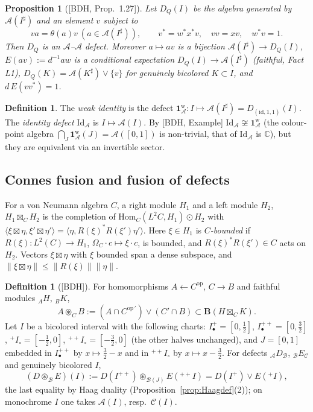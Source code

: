 \documentclass[11pt]{article}
\newtheorem{proposition}[theorem]{Proposition}
\theoremstyle{definition}
\newtheorem{definition}[theorem]{Definition}
\theoremstyle{remark}
\newcommand{\cA}{\mathcal A}
\newcommand{\cB}{\mathcal B}
\newcommand{\cC}{\mathcal C}
\newcommand{\Om}{\Omega}
\newcommand{\bfB}{\mathbf B}
\newcommand{\fus}{\boxtimes}
\newcommand{\cfus}{\circledast}
\newcommand{\ip}[2]{\langle #1,#2\rangle}
\newcommand{\Id}{\mathrm{Id}}
\newcommand{\Wk}{\mathbf 1^{\mathrm w}_{\cA}}
\begin{document}
\begin{proposition}[{[BDH, Prop.~1.27]}]\label{prop:DQ}
Let $D_Q(I)$ be the algebra generated by $\cA(I^\sharp)$ and an element $v$ subject to
\[
va=\theta(a)v\ (a\in\cA(I^\sharp)),\qquad v^*=w^*x^*v,\quad vv=xv,\quad w^*v=1 .
\]
Then $D_Q$ is an $\cA$--$\cA$ defect. Moreover $a\mapsto av$ is a bijection $\cA(I^\sharp)\to D_Q(I)$, $E(av):=d^{-1}aw$ is a conditional expectation $D_Q(I)\to\cA(I^\sharp)$ (faithful, Fact L1), $D_Q(K)=\cA(K^\sharp)\vee\{v\}$ for genuinely bicolored $K\subset I$, and $d\,E(vv^*)=1$.
\end{proposition}

\begin{definition}\label{def:Idnat}
The \emph{weak identity} is the defect $\Wk\colon I\mapsto\cA(I^\sharp)=D_{(\mathrm{id},1,1)}(I)$. The \emph{identity defect} $\Id_\cA$ is $I\mapsto\cA(I)$. By [BDH, Example] $\Id_\cA\not\cong\Wk$ (the colour-point algebra $\bigcap_J\Wk(J)=\cA([0,1])$ is non-trivial, that of $\Id_\cA$ is $\mathbb C$), but they are equivalent via an invertible sector.
\end{definition}

\subsection{Connes fusion and fusion of defects}\label{sec:fusion}
For a von Neumann algebra $C$, a right module $H_1$ and a left module $H_2$, $H_1\fus_CH_2$ is the completion of $\mathrm{Hom}_C(L^2C,H_1)\odot H_2$ with $\ip{\xi\fus\eta}{\xi'\fus\eta'}=\ip{\eta}{R(\xi)^*R(\xi')\eta'}$. Here $\xi\in H_1$ is \emph{$C$-bounded} if $R(\xi)\colon L^2(C)\to H_1$, $\Om_C\cdot c\mapsto\xi\cdot c$, is bounded, and $R(\xi)^*R(\xi')\in C$ acts on $H_2$. Vectors $\xi\fus\eta$ with $\xi$ bounded span a dense subspace, and $\|\xi\fus\eta\|\le\|R(\xi)\|\|\eta\|$.

\begin{definition}[{[BDH]}]\label{def:fusion}
For homomorphisms $A\leftarrow C^{\mathrm{op}}$, $C\to B$ and faithful modules ${}_AH$, ${}_BK$,
\[
A\cfus_CB:=(A\cap C^{\mathrm{op}\,\prime})\vee(C'\cap B)\subset\bfB(H\fus_CK).
\]
Let $I$ be a bicolored interval with the following charts: $I^+_\bullet=[0,\tfrac12]$, $I^{++}_\bullet=[0,\tfrac32]$, ${}^+I_\circ=[-\tfrac12,0]$, ${}^{++}I_\circ=[-\tfrac32,0]$ (the other halves unchanged), and $J=[0,1]$ embedded in $I^{++}_\bullet$ by $x\mapsto\tfrac32-x$ and in ${}^{++}I_\circ$ by $x\mapsto x-\tfrac32$. For defects ${}_\cA D_\cB$, ${}_\cB E_\cC$ and genuinely bicolored $I$,
\[
(D\cfus_\cB E)(I):=D(I^{++})\cfus_{\cB(J)}E({}^{++}I)=D(I^+)\vee E({}^+I),
\]
the last equality by Haag duality (Proposition~\ref{prop:Haagdef}(2)); on monochrome $I$ one takes $\cA(I)$, resp.\ $\cC(I)$.
\end{definition}
\end{document}
